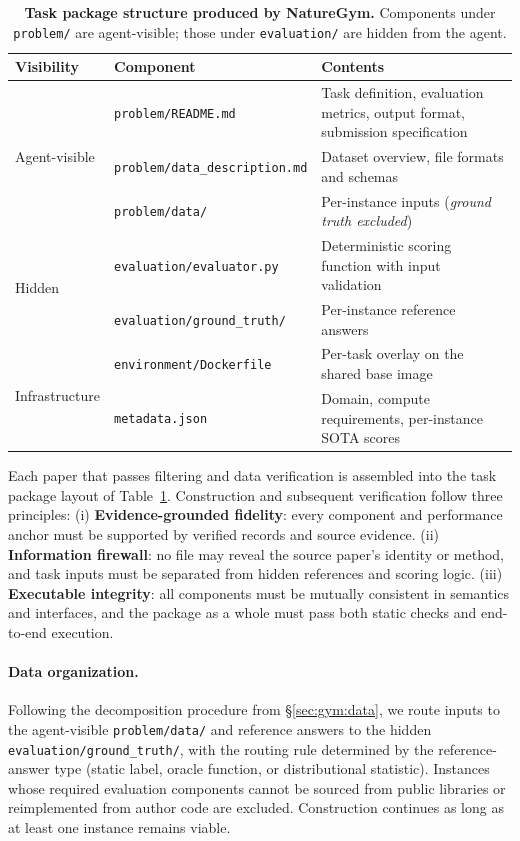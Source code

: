 \documentclass{llmxive}
\begin{document}
\begin{table}[t]
\centering
\small
\begin{tabularx}{\textwidth}{llX}
\toprule
\textbf{Visibility} & \textbf{Component} & \textbf{Contents} \\
\midrule
\multirow{3}{*}{Agent-visible}
  & \texttt{problem/README.md}             & Task definition, evaluation metrics, output format, submission specification \\
  & \texttt{problem/data\_description.md}  & Dataset overview, file formats and schemas \\
  & \texttt{problem/data/}                 & Per-instance inputs (\emph{ground truth excluded}) \\
\midrule
\multirow{2}{*}{Hidden}
  & \texttt{evaluation/evaluator.py}       & Deterministic scoring function with input validation \\
  & \texttt{evaluation/ground\_truth/}     & Per-instance reference answers \\
\midrule
\multirow{2}{*}{Infrastructure}
  & \texttt{environment/Dockerfile}        & Per-task overlay on the shared base image \\
  & \texttt{metadata.json}                 & Domain, compute requirements, per-instance SOTA scores \\
\bottomrule
\end{tabularx}
\caption{\textbf{Task package structure produced by NatureGym.} Components under \texttt{problem/} are agent-visible; those under \texttt{evaluation/} are hidden from the agent.}
\label{tab:taskpkg}
\end{table}

Each paper that passes filtering and data verification is assembled into the task package layout of Table~\ref{tab:taskpkg}.
Construction and subsequent verification follow three principles:
(i) \textbf{Evidence-grounded fidelity}: every component and performance anchor must be supported by verified records and source evidence.
(ii) \textbf{Information firewall}: no file may reveal the source paper's identity or method, and task inputs must be separated from hidden references and scoring logic.
(iii) \textbf{Executable integrity}: all components must be mutually consistent in semantics and interfaces, and the package as a whole must pass both static checks and end-to-end execution.


\paragraph{Data organization.}
Following the decomposition procedure from \S\ref{sec:gym:data}, we route inputs to the agent-visible \texttt{problem/data/} and reference answers to the hidden \texttt{evaluation/ground\_truth/}, with the routing rule determined by the reference-answer type (static label, oracle function, or distributional statistic).
Instances whose required evaluation components cannot be sourced from public libraries or reimplemented from author code are excluded. Construction continues as long as at least one instance remains viable.
\end{document}

